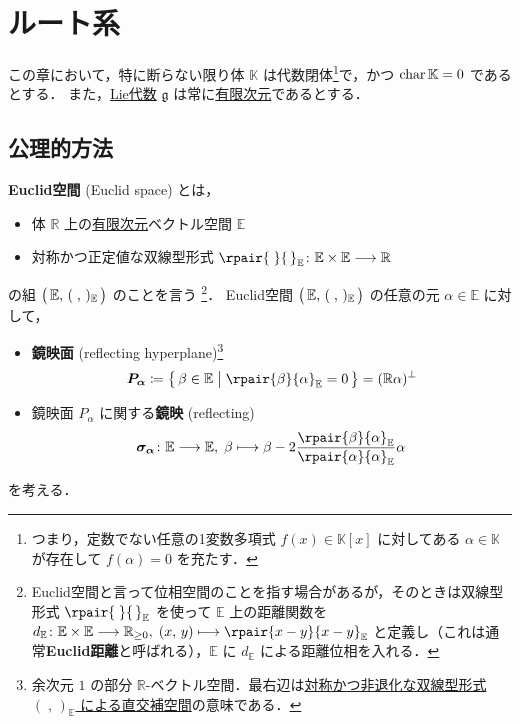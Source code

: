 \documentclass[rep_main]{subfiles}
\begin{document}
\setcounter{chapter}{2}

\chapter{ルート系}

この章において，特に断らない限り体 $\mathbb{K}$ は代数閉体\footnote{つまり，定数でない任意の1変数多項式 $f(x) \in \mathbb{K}[x]$ に対してある $\alpha \in \mathbb{K}$ が存在して $f(\alpha) = 0$ を充たす．}で，かつ $\operatorname{char} \mathbb{K} = 0$ であるとする．
また，\hyperref[ax:LieAlg]{Lie代数} $\mathfrak{g}$ は常に\underline{有限次元}であるとする．

\section{公理的方法}

\label{def:Euclid-space}\textbf{Euclid空間} (Euclid space) とは，
\begin{itemize}
	\item 体 $\mathbb{R}$ 上の\underline{有限次元}ベクトル空間 $\mathbb{E}$
	\item 対称かつ正定値な双線型形式 $\rpair{\;}{\,}_{\mathbb{E}}\colon \mathbb{E} \times \mathbb{E} \lto \mathbb{R}$
\end{itemize}
の組 $\bigl(\, \mathbb{E},\, (\;,\,)_{\mathbb{E}}\,\bigr)$ のことを言う
\footnote{Euclid空間と言って位相空間のことを指す場合があるが，そのときは双線型形式 $\rpair{\;}{\,}_{\mathbb{E}}$ を使って $\mathbb{E}$ 上の距離関数を $d_{\mathbb{E}} \colon \mathbb{E} \times \mathbb{E} \lto \mathbb{R}_{\ge 0},\; (x,\, y) \lmto \rpair{x-y}{x-y}_{\mathbb{E}}$ と定義し（これは通常\textbf{Euclid距離}と呼ばれる），$\mathbb{E}$ に $d_{\mathbb{E}}$ による距離位相を入れる．}．
Euclid空間 $\bigl(\, \mathbb{E},\, (\;,\,)_{\mathbb{E}}\,\bigr)$ の任意の元 $\alpha \in \mathbb{E}$ に対して，
\begin{itemize}
    \item \textbf{鏡映面} (reflecting hyperplane)\footnote{余次元 $1$ の部分 $\mathbb{R}$-ベクトル空間．最右辺は\hyperref[def:radical-bilinear]{対称かつ非退化な双線型形式 $(\;,\,)_{\mathbb{E}}$ による直交補空間}の意味である．}
    \begin{align}
        \label{def:hyperplane}
        \bm{P_\alpha} \coloneqq \bigl\{\, \beta \in \mathbb{E} \bigm| \rpair{\beta}{\alpha}_{\mathbb{E}} = 0 \,\bigr\} = (\mathbb{R}\alpha)^\perp
    \end{align}
    \item 鏡映面 $P_\alpha$ に関する\textbf{鏡映} (reflecting)
    \begin{align}
        \bm{\sigma_\alpha} \colon \mathbb{E} \lto \mathbb{E},\; \beta \lmto \beta - 2 \frac{\rpair{\beta}{\alpha}_{\mathbb{E}}}{\rpair{\alpha}{\alpha}_{\mathbb{E}}} \alpha
    \end{align}
\end{itemize}
を考える．
\end{document}

